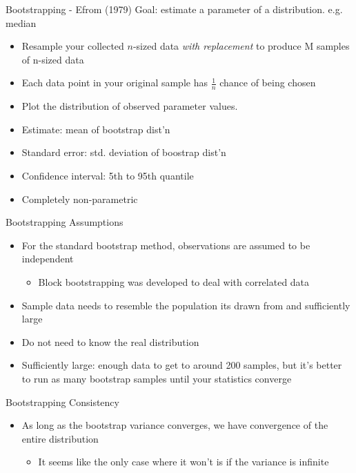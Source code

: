 \begin{frame}{Bootstrapping - Efrom (1979)}
Goal: estimate a parameter of a distribution. e.g. median
    \begin{itemize}
        \item Resample your collected $n$-sized data \textit{with replacement} to produce M samples of n-sized data
        \item Each data point in your original sample has $\frac{1}{n}$ chance of being chosen
        \item Plot the distribution of observed parameter values.
        \item Estimate: mean of bootstrap dist'n
        \item Standard error: std. deviation of boostrap dist'n
        \item Confidence interval: 5th to 95th quantile 
        \item Completely non-parametric
    \end{itemize}
\end{frame}

\begin{frame}{Bootstrapping Assumptions}
    \begin{itemize}
        \item For the standard bootstrap method, observations are assumed to be independent
        \begin{itemize}
            \item Block bootstrapping was developed to deal with correlated data
        \end{itemize}
        \item Sample data needs to resemble the population its drawn from and sufficiently large
        \item Do not need to know the real distribution
        \item Sufficiently large: enough data to get to around 200 samples, but it's better to run as many bootstrap samples until your statistics converge
    \end{itemize}
\end{frame}

\begin{frame}{Bootstrapping Consistency}
    \begin{itemize}
        \item As long as the bootstrap variance converges, we have convergence of the entire distribution
        \begin{itemize}
            \item It seems like the only case where it won't is if the variance is infinite
        \end{itemize}
    \end{itemize}
\end{frame}


